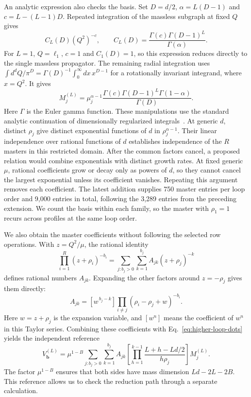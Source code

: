 An analytic expression also checks the basis. Set $D=d/2$,
$\alpha=L(D-1)$ and $c=L-(L-1)D$. Repeated integration of the
massless subgraph at fixed $Q$ gives
\begin{equation}
 C_L(D)(Q^2)^{-c},\qquad
 C_L(D)=\frac{\Gamma(c)\Gamma(D-1)^L}{\Gamma(\alpha)} .
 \label{eq:higher-loop-convolution}
\end{equation}
For $L=1$, $Q=\ell_1$, $c=1$ and $C_1(D)=1$, so this expression
reduces directly to the single massless propagator. The remaining radial integration uses
$\int d^dQ/\pi^D=\Gamma(D)^{-1}\int_0^\infty
dx\,x^{D-1}$ for a rotationally invariant integrand, where $x=Q^2$.
It gives
\begin{equation}
 M_j^{(L)}=
 \mu_j^{\alpha-1}
 \frac{\Gamma(c)\Gamma(D-1)^L\Gamma(1-\alpha)}{\Gamma(D)} .
 \label{eq:higher-loop-master-value}
\end{equation}
Here $\Gamma$ is the Euler gamma function. These manipulations use
the standard analytic continuation of dimensionally regularized
integrals~\cite{Weinzierl2022}. At generic $d$, distinct $\rho_j$
give distinct exponential functions of $d$ in
$\rho_j^{\alpha-1}$. Their linear independence over rational
functions of $d$ establishes independence of the $R$ masters in this
restricted domain. After the common factors cancel, a proposed
relation would combine exponentials with distinct growth rates.
At fixed generic $\mu$, rational coefficients grow or decay only
as powers of $d$, so they cannot cancel the largest exponential
unless its coefficient vanishes. Repeating this argument removes
each coefficient. The latest addition supplies 750 master entries
per loop order and 9,000 entries in total, following the 3,289
entries from the preceding extension. We count the basis
within each family, so the master with $\rho_1=1$ recurs across
profiles at the same loop order.

We also obtain the master coefficients without following the selected
row operations. With $z=Q^2/\mu$, the rational identity
\begin{equation}
 \prod_{i=1}^{R}(z+\rho_i)^{-b_i}
 =\sum_{j:b_j>0}\sum_{k=1}^{b_j}
                 A_{jk}(z+\rho_j)^{-k}
 \label{eq:higher-loop-oracle}
\end{equation}
defines rational numbers $A_{jk}$. Expanding the other factors
around $z=-\rho_j$ gives them directly:
\begin{equation}
 A_{jk}=[w^{\,b_j-k}]
           \prod_{i\ne j}(\rho_i-\rho_j+w)^{-b_i}.
 \label{eq:higher-loop-taylor}
\end{equation}
Here $w=z+\rho_j$ is the expansion variable, and $[w^n]$ means
the coefficient of $w^n$ in this Taylor
series. Combining these coefficients with
Eq.~\eqref{eq:higher-loop-dots} yields the independent reference
\begin{equation}
 V^{(L)}_{\boldsymbol b}
 =\mu^{1-B}\sum_{j:b_j>0}\sum_{k=1}^{b_j}A_{jk}
   \left[\prod_{h=1}^{k-1}
             \frac{L+h-Ld/2}{h\rho_j}\right]M_j^{(L)} .
 \label{eq:higher-loop-reference}
\end{equation}
The factor $\mu^{1-B}$ ensures that both sides have mass dimension
$Ld-2L-2B$. This reference allows us to check the reduction path
through a separate calculation.

